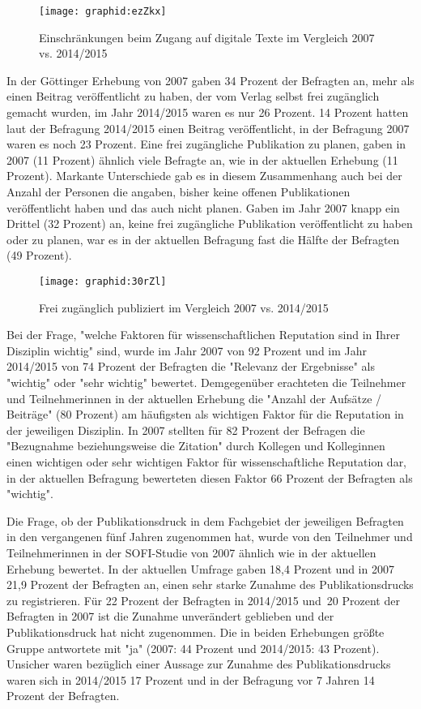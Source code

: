 \begin{figure}[h!]
\texttt{[image: graphid:ezZkx]}
\caption{Einschränkungen beim Zugang auf digitale Texte im Vergleich 2007 vs. 2014/2015}
\end{figure}

In der Göttinger Erhebung von 2007 gaben 34 Prozent der Befragten an, mehr als einen Beitrag veröffentlicht zu haben, der vom Verlag selbst frei zugänglich gemacht wurden, im Jahr 2014/2015 waren es nur 26 Prozent. 14 Prozent hatten laut der Befragung 2014/2015 einen Beitrag veröffentlicht, in der Befragung 2007 waren es noch 23 Prozent. Eine frei zugängliche Publikation zu planen, gaben in 2007 (11 Prozent) ähnlich viele Befragte an, wie in der aktuellen Erhebung (11 Prozent). Markante Unterschiede gab es in diesem Zusammenhang auch bei der Anzahl der Personen die angaben, bisher keine offenen Publikationen veröffentlicht haben und das auch nicht planen. Gaben im Jahr 2007 knapp ein Drittel (32 Prozent) an, keine frei zugängliche Publikation veröffentlicht zu haben oder zu planen, war es in der aktuellen Befragung fast die Hälfte der Befragten (49 Prozent).

\begin{figure}[h!]
\texttt{[image: graphid:30rZl]}
\caption{Frei zugänglich publiziert im Vergleich 2007 vs. 2014/2015}
\end{figure}

Bei der Frage, "welche Faktoren für wissenschaftlichen Reputation sind in Ihrer Disziplin wichtig" sind, wurde im Jahr 2007 von 92 Prozent und im Jahr 2014/2015 von 74 Prozent der Befragten die "Relevanz der Ergebnisse" als "wichtig" oder "sehr wichtig" bewertet. Demgegenüber erachteten die Teilnehmer und Teilnehmerinnen in der aktuellen Erhebung die "Anzahl der Aufsätze / Beiträge" (80 Prozent) am häufigsten als wichtigen Faktor für die Reputation in der jeweiligen Disziplin. In 2007 stellten für 82 Prozent der Befragen die "Bezugnahme beziehungsweise die Zitation" durch Kollegen und Kolleginnen einen wichtigen oder sehr wichtigen Faktor für wissenschaftliche Reputation dar, in der aktuellen Befragung bewerteten diesen Faktor 66 Prozent der Befragten als "wichtig".

Die Frage, ob der Publikationsdruck in dem Fachgebiet der jeweiligen Befragten in den vergangenen fünf Jahren zugenommen hat, wurde von den Teilnehmer und Teilnehmerinnen in der SOFI-Studie von 2007 ähnlich wie in der aktuellen Erhebung bewertet. In der aktuellen Umfrage gaben 18,4 Prozent und in 2007 21,9 Prozent der Befragten an, einen sehr starke Zunahme des Publikationsdrucks zu registrieren. Für 22 Prozent der Befragten in 2014/2015 und 20 Prozent der Befragten in 2007 ist die Zunahme unverändert geblieben und der Publikationsdruck hat nicht zugenommen. Die in beiden Erhebungen größte Gruppe antwortete mit "ja" (2007: 44 Prozent und 2014/2015: 43 Prozent). Unsicher waren bezüglich einer Aussage zur Zunahme des Publikationsdrucks waren sich in 2014/2015 17 Prozent und in der Befragung vor 7 Jahren 14 Prozent der Befragten.

